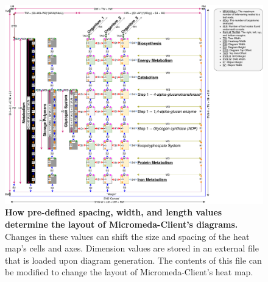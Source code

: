 \begin{figure}[!ht]
  \centering
	\includegraphics[width=\textwidth]{media/diagram_measurements.pdf}
	 \caption[How pre-defined spacing, width, and length values determine the 
layout of Micromeda-Client's diagrams.]{\textbf{How pre-defined spacing, width, 
and length values determine the layout of Micromeda-Client's diagrams.} Changes 
in these values can shift the size and spacing of the heat map's cells and axes. 
Dimension values are stored in an external file that is loaded upon diagram 
generation. The contents of this file can be modified to change the layout of 
Micromeda-Client's heat map.}
	 \label{fig:diagram-measurements}
\end{figure}

